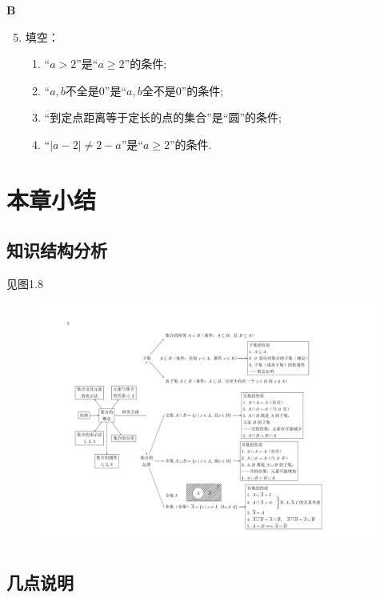 \begin{center}
    \bfseries B
\end{center}

\begin{enumerate}\setcounter{enumi}{4}
    \item 填空：
\begin{enumerate}[(1)]
    \item “$a>2$”是“$a\ge 2$”的\blank 条件;
    \item “$a,b$不全是0”是“$a,b$全不是0”的\blank 条件;
    \item “到定点距离等于定长的点的集合”是“圆”的\blank 条件;
    \item “$|a-2|\ne 2-a$”是“$a\ge 2$”的\blank 条件.
\end{enumerate}
\end{enumerate}

\section{本章小结}
\subsection{知识结构分析}
见图1.8


\begin{landscape}
\begin{figure}[htp]
    \centering
\includegraphics[scale=.7]{fig/fig1-8.pdf}
    \caption{}
\end{figure}
\end{landscape}


\subsection{几点说明}

